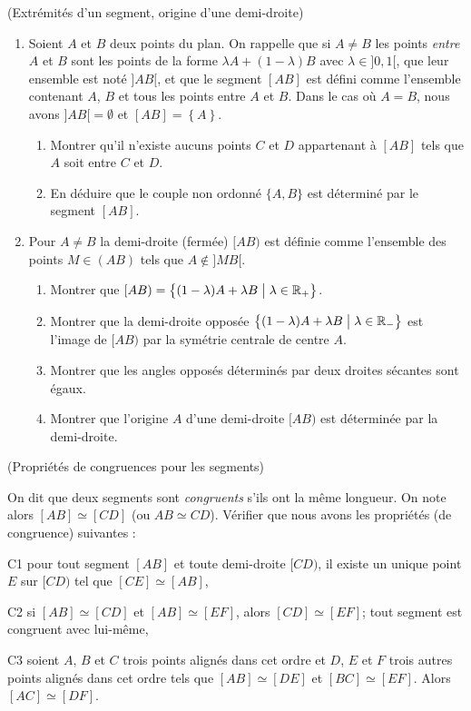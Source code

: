 \documentclass[a4paper,11pt,reqno]{amsart}
\newcommand*{\ensemble}[3][]{#1\{ #2 \;#1|\; #3 #1\}} %
\begin{document}
\begin{exo} (Extrémités d'un segment, origine d'une demi-droite)

  \begin{enumerate}
    \item Soient $A$ et $B$ deux points du plan. On rappelle que si $A \neq B$ les points \emph{entre} $A$ et $B$ sont les points de la forme $\lambda A + (1-\lambda) B$ avec $\lambda \in ]0,1[$, que leur ensemble est noté $]AB[$, et que le segment $[AB]$ est défini comme l'ensemble contenant $A$, $B$ et tous les points entre $A$ et $B$. Dans le cas où $A=B$, nous avons $]AB[ = \emptyset$ et $[AB] = \left\{ A \right\}$.
    \begin{enumerate}
      \item Montrer qu'il n'existe aucuns points $C$ et $D$ appartenant à $[AB]$ tels que $A$ soit entre $C$ et $D$.
      \item En déduire que le couple non ordonné $\{A,B\}$ est déterminé par le segment $[AB]$.
    \end{enumerate}
    \item Pour $A \neq B$ la demi-droite (fermée) $[AB)$ est définie comme l'ensemble des points $M \in (AB)$ tels que $A \notin ]MB[$.
    \begin{enumerate}
      \item Montrer que $[AB) = \ensemble[\big]{(1- \lambda )A + \lambda B}{\lambda \in \R_{+}}$.
      \item Montrer que la demi-droite opposée $\ensemble[\big]{(1- \lambda )A + \lambda B}{\lambda \in \R_{-}}$ est l'image de $[AB)$ par la symétrie centrale de centre $A$.
      \item Montrer que les angles opposés déterminés par deux droites sécantes sont égaux.
      \item Montrer que l'origine $A$ d'une demi-droite $[AB)$ est déterminée par la demi-droite.
    \end{enumerate}
  \end{enumerate}
\end{exo}

\begin{exo} (Propriétés de congruences pour les segments)

On dit que deux segments sont \emph{congruents} s'ils ont la même longueur. On note alors $[AB]\simeq[CD]$ (ou $AB \simeq CD$). Vérifier que nous avons les propriétés (de congruence) suivantes :
  \begin{axioms}[leftmargin=2.8em]
    \item[C1] pour tout segment $[AB]$ et toute demi-droite $[CD)$, il existe un unique point $E$ sur $[CD)$ tel que $[CE]\simeq[AB]$,
    \item[C2] si $[AB]\simeq[CD]$ et $[AB]\simeq[EF]$, alors $[CD]\simeq[EF]$; tout segment est congruent avec lui-même,
    \item[C3] soient $A$, $B$ et $C$ trois points alignés dans cet ordre et $D$, $E$ et $F$ trois autres points alignés dans cet ordre tels que $[AB]\simeq [DE]$ et $[BC]\simeq[EF]$. Alors $[AC]\simeq[DF]$.
  \end{axioms}
\end{exo}
\end{document}
